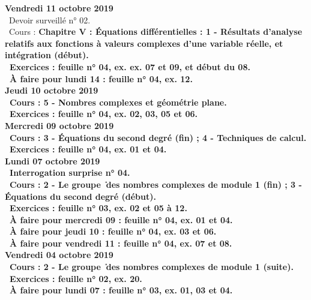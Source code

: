\documentclass[12pt,a4paper]{article}
\begin{document}
\noindent\textbf{Vendredi 11 octobre 2019}\\
\bu\ Devoir surveillé n° 02.\\
 \bu\ Cours : \bf Chapitre V \rm : Équations différentielles : 1 - Résultats d'analyse relatifs aux fonctions à 
valeurs complexes d'une variable réelle, et intégration (début).\\
 \bu\ Exercices : feuille n° 04, ex. ex. 07 et 09, et début du 08.\\
 \bu\ À faire pour lundi 14 : feuille n° 04, ex. 12.\vspace{.4cm}\\
  
 \noindent\textbf{Jeudi 10 octobre 2019}\\
 \bu\ Cours : 5 - Nombres complexes et géométrie plane.\\
 \bu\ Exercices : feuille n° 04, ex. 02, 03, 05 et 06.\vspace{.4cm}\\
  
\noindent\textbf{\bf Mercredi 09 octobre 2019}\\
\bu\ Cours : 3 - Équations du second degré (fin) ; 4 - Techniques de calcul.\\
 \bu\ Exercices : feuille n° 04, ex. 01 et 04.\vspace{.4cm}\\

\noindent\textbf{\bf Lundi 07 octobre 2019}\\
\bu\ Interrogation surprise n° 04.\\ 
\bu\ Cours : 2 - Le groupe \U\ des nombres complexes de module 1 (fin) ; 3 - Équations du second 
degré (début).\\
\bu\ Exercices : feuille n° 03, ex. 02 et 05 à 12.\\
\bu\ À faire pour mercredi 09 : feuille n° 04, ex. 01 et 04.\\
\bu\ À faire pour jeudi 10 : feuille n° 04, ex. 03 et 06.\\
\bu\ À faire pour vendredi 11 : feuille n° 04, ex. 07 et 08.\vspace{.4cm}\\

\noindent\textbf{Vendredi 04 octobre 2019}\\
\bu\ Cours : 2 - Le groupe \U\ des nombres complexes de module 1 (suite).\\
\bu\ Exercices : feuille n° 02, ex. 20.\\
\bu\ À faire pour lundi 07 : feuille n° 03, ex. 01, 03 et 04.\vspace{.4cm}\\ 
\end{document}
